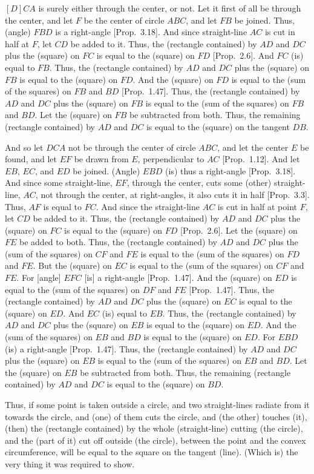 \begin{Parallel}{}{}
{$[D]CA$ is surely either through the center, or not. Let it first of all be
through the center, and let $F$ be the center of circle $ABC$, and let 
$FB$ be joined. Thus, (angle) $FBD$ is a right-angle [Prop.~3.18].
And since straight-line $AC$ is cut in half at $F$, let $CD$ be added to it.
Thus, the (rectangle contained) by $AD$ and $DC$ plus the (square) on $FC$ is
equal to the (square) on $FD$ [Prop.~2.6]. And $FC$ (is) equal to $FB$.
Thus, the (rectangle contained) by $AD$ and $DC$ plus the (square) on $FB$
is equal to the (square) on $FD$. And the (square) on $FD$ is equal to
the (sum of the squares) on $FB$ and $BD$ [Prop.~1.47]. Thus, the
(rectangle contained) by $AD$ and $DC$ plus the (square) on $FB$ is equal
to the (sum of the squares) on $FB$ and $BD$. Let the (square) on $FB$ be subtracted
from both. Thus, the remaining (rectangle contained) by $AD$ and $DC$ 
is equal to the (square) on the tangent $DB$.

And so let $DCA$ not be through the center of circle $ABC$, and let the center $E$
be found, and let $EF$ be drawn from $E$, perpendicular to
$AC$ [Prop.~1.12]. And let $EB$, $EC$, and $ED$ be joined. (Angle)
$EBD$ (is) thus a right-angle [Prop.~3.18]. And since some straight-line, $EF$, through the
center, cuts some (other) straight-line, $AC$, not through the center, at
right-angles, it also cuts it in half [Prop.~3.3]. Thus, $AF$ is equal to
$FC$. And since the straight-line $AC$ is cut in half at point $F$, let $CD$ 
be added to it. Thus, the (rectangle contained) by $AD$ and
 $DC$ plus the
(square) on $FC$ is equal to the (square) on $FD$ [Prop.~2.6]. Let
the (square) on $FE$ be added to both. Thus, the (rectangle contained)
by $AD$ and $DC$ plus the (sum of the squares) on $CF$ and $FE$ is equal to
the (sum of the squares) on $FD$ and $FE$. But  the (square) on $EC$  is equal to the (sum of the squares)
on $CF$ and $FE$. For [angle] $EFC$ [is] a
right-angle [Prop.~1.47]. And the (square) on $ED$ is equal to the (sum of the squares) on $DF$ and
$FE$   [Prop.~1.47]. Thus, the (rectangle
contained) by $AD$ and $DC$ plus the (square) on $EC$ is equal to the (square)
on $ED$. And $EC$ (is) equal to $EB$. Thus, the (rectangle
contained) by $AD$ and $DC$ plus the (square) on $EB$ is equal to the (square)
on $ED$. And the (sum of the squares) on 
$EB$ and $BD$  is equal to  the (square) on $ED$. For $EBD$ (is) a right-angle [Prop.~1.47]. Thus, the (rectangle
contained) by $AD$ and $DC$ plus the (square) on $EB$ is equal to the (sum of the squares)
on $EB$ and $BD$. Let the (square) on $EB$ be subtracted from both. Thus, the remaining
(rectangle contained) by $AD$ and $DC$ is equal to the (square) on $BD$.

Thus, if some point is taken outside a circle, and  two straight-lines
radiate from it towards the circle, and (one) of them cuts the circle, and (the other) touches (it), (then) the (rectangle contained) by the whole  (straight-line) cutting (the circle), and the (part of it) 
cut off outside (the circle),
between the point and the convex circumference, will be equal to the
square on the tangent (line). (Which is) the very thing it was required to show.}
\end{Parallel}

